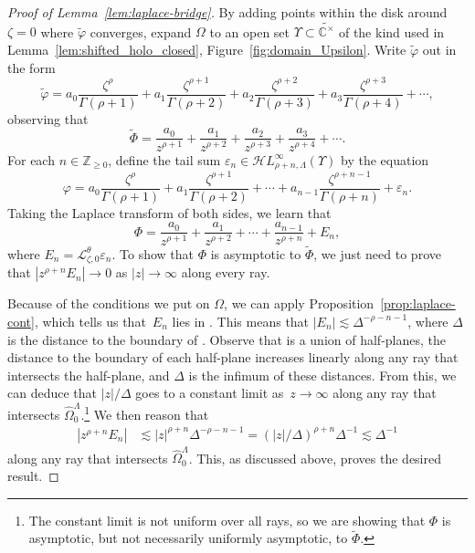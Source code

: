 \documentclass[10pt,a4paper]{amsart}
\newcommand{\singexp}[2]{\mathcal{H}L^\infty_{#1, #2}}
\newcommand{\dualsingexp}[1]{\widehat{\mathcal{H}}L^\infty_{#1}}
\newcommand{\Z}{\mathbb{Z}}
\newcommand{\C}{\mathbb{C}}
\newcommand{\series}[1]{\tilde{#1}}
\newcommand{\laplace}{\mathcal{L}}
\numberwithin{equation}{section}
\begin{document}
\begin{proof}[Proof of Lemma~\ref{lem:laplace-bridge}]
By adding points within the disk around $\zeta = 0$ where $\series{\varphi}$ converges, expand $\Omega$ to an open set $\Upsilon \subset \widetilde{\C^\times}$ of the kind used in Lemma~\ref{lem:shifted_holo_closed}, Figure~\ref{fig:domain_Upsilon}. Write $\series{\varphi}$ out in the form
\[ \series{\varphi} = a_0 \frac{\zeta^\rho}{\Gamma(\rho+1)} + a_1 \frac{\zeta^{\rho+1}}{\Gamma(\rho+2)} + a_2 \frac{\zeta^{\rho+2}}{\Gamma(\rho+3)} + a_3 \frac{\zeta^{\rho+3}}{\Gamma(\rho+4)} + \cdots, \]
observing that
\[ \series{\Phi} = \frac{a_0}{z^{\rho+1}} + \frac{a_1}{z^{\rho+2}} + \frac{a_2}{z^{\rho+3}} + \frac{a_3}{z^{\rho+4}} + \cdots. \]
For each $n \in \Z_{\ge 0}$, define the tail sum $\varepsilon_n \in \singexp{\rho+n}{\Lambda}(\Upsilon)$ by the equation
\[ \varphi = a_0 \frac{\zeta^\rho}{\Gamma(\rho+1)} + a_1 \frac{\zeta^{\rho+1}}{\Gamma(\rho+2)} + \cdots + a_{n-1} \frac{\zeta^{\rho+n-1}}{\Gamma(\rho+n)} + \varepsilon_n. \]
Taking the Laplace transform of both sides, we learn that
\[ \Phi = \frac{a_0}{z^{\rho+1}} + \frac{a_1}{z^{\rho+2}} + \cdots + \frac{a_{n-1}}{z^{\rho+n}} + E_n, \]
where $E_n = \laplace_{\zeta, 0}^\theta \varepsilon_n$. To show that $\Phi$ is asymptotic to $\series{\Phi}$, we just need to prove that $|z^{\rho+n} E_n| \to 0$ as $|z| \to \infty$ along every ray.

Because of the conditions we put on $\Omega$, we can apply Proposition~\ref{prop:laplace-cont}, which tells us that~$E_n$ lies in \smash{$\dualsingexp{-\rho-n-1}\bigl(\widehat{\Omega}_0^\Lambda\bigr)$}. This means that $|E_n| \lesssim \Delta^{-\rho-n-1}$, where $\Delta$ is the distance to the boundary of . Observe that  is a union of half-planes, the distance to the boundary of each half-plane increases linearly along any ray that intersects the half-plane, and $\Delta$ is the infimum of these distances. From this, we can deduce that $|z|/\Delta$ goes to a constant limit as~${z \to \infty}$ along any ray that intersects $\widehat{\Omega}_0^\Lambda$.\footnote{The constant limit is not uniform over all rays, so we are showing that $\Phi$ is asymptotic, but not necessarily uniformly asymptotic, to $\series{\Phi}$.} We then reason that
\begin{align*}
|z^{\rho+n} E_n| & \lesssim |z|^{\rho+n} \Delta^{-\rho-n-1} = (|z|/\Delta)^{\rho+n} \Delta^{-1} \lesssim \Delta^{-1}
\end{align*}
along any ray that intersects $\widehat{\Omega}_0^\Lambda$. This, as discussed above, proves the desired result.
\end{proof}
\end{document}
